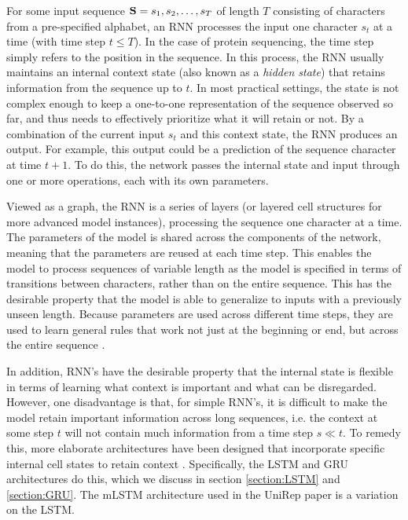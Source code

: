 \documentclass[a4paper,12pt]{article}
\begin{document}
For some input sequence $\mathbf{ S } = s_1, s_2, \ldots, s_T$ of length $T$ consisting of characters from a pre-specified alphabet, an RNN processes the input one character $s_t$ at a time (with time step $t \leq T$). In the case of protein sequencing, the time step simply refers to the position in the sequence. In this process, the RNN usually maintains an internal context state (also known as a \textit{hidden state}) that retains information from the sequence up to $t$. In most practical settings, the state is not complex enough to keep a one-to-one representation of the sequence observed so far, and thus needs to effectively prioritize what it will retain or not. By a combination of the current input $s_t$ and this context state, the RNN produces an output. For example, this output could be a prediction of the sequence character at time $t + 1$. To do this, the network passes the internal state and input through one or more operations, each with its own parameters.

Viewed as a graph, the RNN is a series of layers (or layered cell structures for more advanced model instances), processing the sequence one character at a time. The parameters of the model is shared across the components of the network, meaning that the parameters are reused at each time step. This enables the model to process sequences of variable length as the model is specified in terms of transitions between characters, rather than on the entire sequence. This has the desirable property that the model is able to generalize to inputs with a previously unseen length. Because parameters are used across different time steps, they are used to learn general rules that work not just at the beginning or end, but across the entire sequence \cite{Goodfellow-et-al-2016}.

In addition, RNN's have the desirable property that the internal state is flexible in terms of learning what context is important and what can be disregarded. However, one disadvantage is that, for simple RNN's, it is difficult to make the model retain important information across long sequences, i.e. the context at some step $t$ will not contain much information from a time step $s \ll t$. To remedy this, more elaborate architectures have been designed that incorporate specific internal cell states to retain context \cite{graves2012supervised}. Specifically, the LSTM and GRU architectures do this, which we discuss in section \ref{section:LSTM} and \ref{section:GRU}. The mLSTM architecture used in the UniRep paper is a variation on the LSTM.
\end{document}
